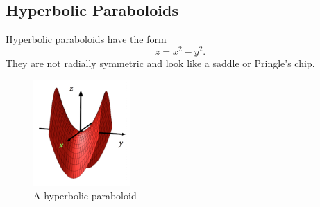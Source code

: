 \subsection{Hyperbolic Paraboloids}
\noindent
Hyperbolic paraboloids have the form
\begin{equation*}
	z = x^2 - y^2.
\end{equation*} 
They are not radially symmetric and look like a saddle or Pringle's chip.

\begin{figure}[H]
	\centering
	\includegraphics[width=0.33\textwidth]{./Images/differentialMultivariableCalculus/hyperbolic_paraboloid.png}
	\caption{A hyperbolic paraboloid}
\end{figure}